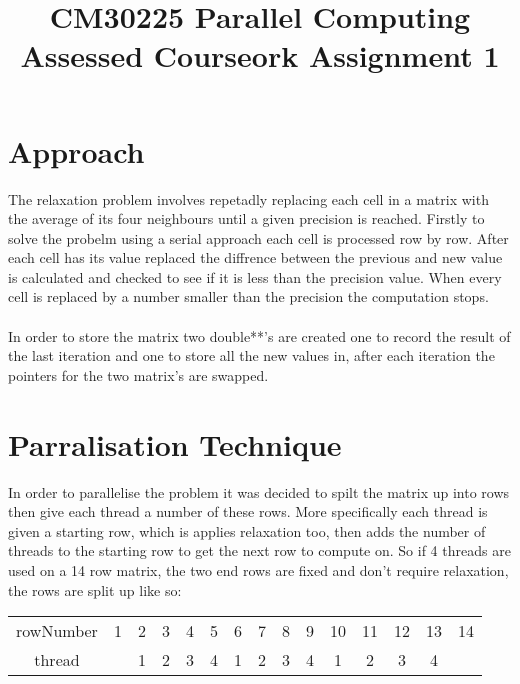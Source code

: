 \documentclass{article}
\begin{document}
\title{CM30225 Parallel Computing \\ Assessed Courseork Assignment 1}
\author{}

\maketitle

\section{Approach}
The relaxation problem involves repetadly replacing each cell in a matrix with the
average of its four neighbours until a given precision is reached. Firstly to solve
the probelm using a serial approach each cell is processed row by row. After each
cell has its value replaced the diffrence between the previous and new value is
calculated and checked to see if it is less than the precision value. When every
cell is replaced by a number smaller than the precision the computation stops.\\~\\
In order to store the matrix two double**'s are created one to record the result of
the last iteration and one to store all the new values in, after each iteration the
pointers for the two matrix's are swapped.


\section{Parralisation Technique}
In order to parallelise the problem it was decided to spilt the matrix up into rows
then give each thread a number of these rows. More specifically each thread is
given a starting row, which is applies relaxation too, then adds the number of
threads to the starting row to get the next row to compute on. So if 4 threads
are used on a 14 row matrix, the two end rows are fixed and don't require relaxation,
the rows are split up like so:

\begin{center}
\begin{tabular}{ |c|c|c|c|c|c|c|c|c|c|c|c|c|c|c| }
 \hline
 rowNumber & 1 & 2 & 3 & 4 & 5 & 6 & 7 & 8 & 9 & 10 & 11 & 12 & 13 & 14 \\
 thread &  & 1 & 2 & 3 & 4 & 1 & 2 & 3 & 4 & 1 & 2 & 3 & 4 &  \\
 \hline
\end{tabular}
\end{center}
\end{document}
